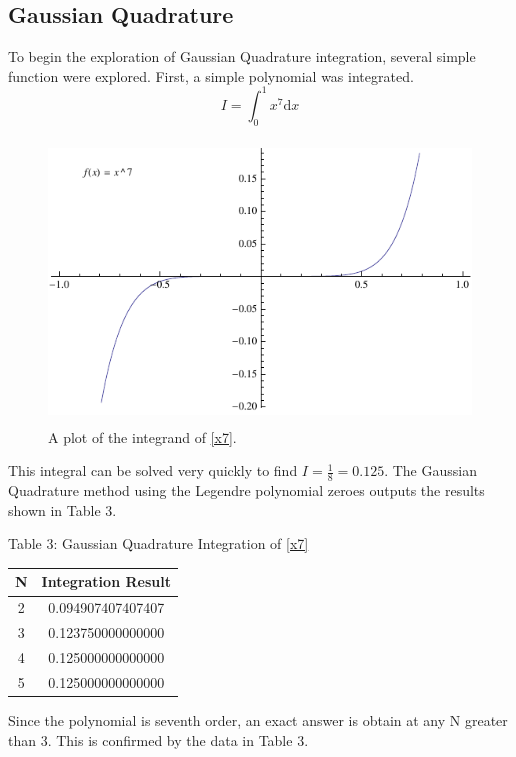 \documentclass[12pt]{article}
\begin{document}
\subsection{Gaussian Quadrature}
To begin the exploration of Gaussian Quadrature integration, several simple function were explored.  First, a simple polynomial was integrated.
\begin{equation}
\label{x7}
I = \int_0^1 x^7 \mathrm{d}x
\end{equation}
\begin{figure}[!h]
\centering
\includegraphics[width =120 mm, height = 75mm]{Ex_4_15.pdf}
\caption{A plot of the integrand of \eqref{x7}.}
\label{fig:415}
\end{figure}
This integral can be solved very quickly to find $I=\frac{1}{8}=0.125$.  The Gaussian Quadrature method using the Legendre polynomial zeroes outputs the results shown in Table 3.
\begin{center}
Table 3:  Gaussian Quadrature Integration of \eqref{x7} \\
\begin{tabular}{ | c | c |}
\hline
N & Integration Result \\ \hline
2&	0.094907407407407 \\ \hline
3&	0.123750000000000 \\ \hline
4&	0.125000000000000 \\ \hline
5&	0.125000000000000 \\ \hline
\end{tabular}
\end{center}
Since the polynomial is seventh order, an exact answer is obtain at any N greater than 3.  This is confirmed by the data in Table 3.
\end{document}
